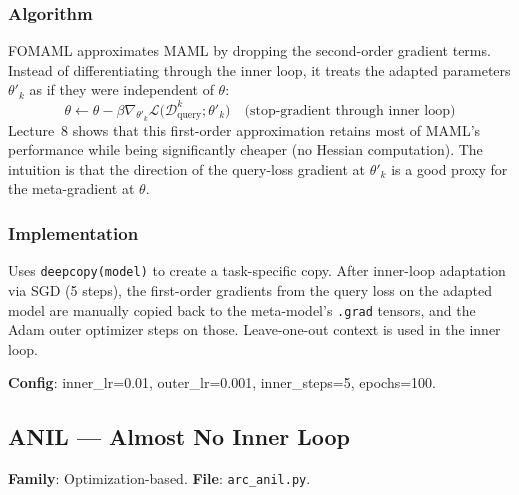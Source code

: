 \documentclass[11pt,a4paper]{article}
\begin{document}
\subsubsection{Algorithm}
FOMAML approximates MAML by dropping the second-order gradient terms. Instead of differentiating through the inner loop, it treats the adapted parameters $\theta'_k$ as if they were independent of $\theta$:
\begin{equation}
  \theta \leftarrow \theta - \beta \nabla_{\theta'_k} \mathcal{L}\bigl(\mathcal{D}_{\text{query}}^k; \theta'_k\bigr) \quad \text{(stop-gradient through inner loop)}
\end{equation}
Lecture~8 shows that this first-order approximation retains most of MAML's performance while being significantly cheaper (no Hessian computation). The intuition is that the direction of the query-loss gradient at $\theta'_k$ is a good proxy for the meta-gradient at $\theta$.

\subsubsection{Implementation}
Uses \texttt{deepcopy(model)} to create a task-specific copy. After inner-loop adaptation via SGD (5 steps), the first-order gradients from the query loss on the adapted model are manually copied back to the meta-model's \texttt{.grad} tensors, and the Adam outer optimizer steps on those. Leave-one-out context is used in the inner loop.

\textbf{Config}: inner\_lr=0.01, outer\_lr=0.001, inner\_steps=5, epochs=100.

\subsection{ANIL --- Almost No Inner Loop~\cite{raghu2020}}
\textbf{Family}: Optimization-based. \textbf{File}: \texttt{arc\_anil.py}.
\end{document}
